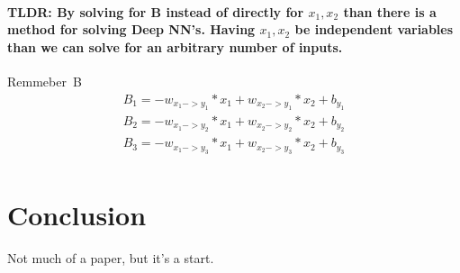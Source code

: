 \documentclass{article}
\begin{document}
\paragraph{TLDR: By solving for B instead of directly for $x_1, x_2$ than there is a method for solving Deep NN's. Having $x_1, x_2$ be independent
variables than we can solve for an arbitrary number of inputs.\newline} 

\hbox{Remmeber B}
\begin{multline}
    B_1 = -w_{x_1->y_1} * x_1 + w_{x_2->y_1} * x_2 + b_{y_1}\\
    B_2 = -w_{x_1->y_2} * x_1 + w_{x_2->y_2} * x_2 + b_{y_2}\\
    B_3 = -w_{x_1->y_3} * x_1 + w_{x_2->y_3} * x_2 + b_{y_3}\\
\end{multline}





\section{Conclusion}
Not much of a paper, but it's a start.
\end{document}
